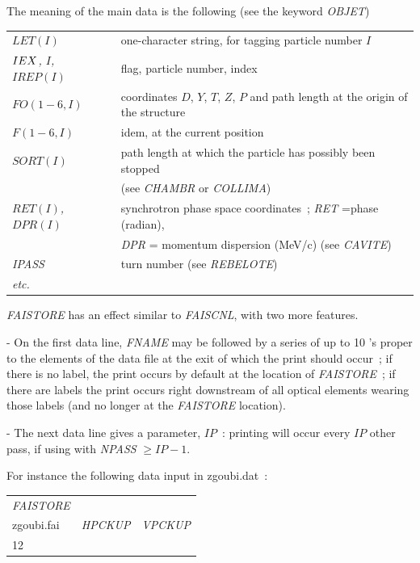 \noindent The meaning of the main data is the following (see the keyword \textsl{OBJET})
\bigskip

{\renewcommand{\arraystretch}{1}
 \begin{tabular}{>{\sl}l!{~:}l}
	$LET(I) $  & one-character string, for tagging particle number $I$  \\
	$IEX\index{IEX@{\IEX}}$, $I$, $IREP(I)$   &  flag, particle number, index  \\
	 $FO(1-6, I)$  &  coordinates $D$, $Y$, $T$, $Z$, $P$ and path
	                 length at the origin of the structure\\
	 $F(1-6, I)$  &  idem, at the current position\\
     $SORT(I)$ & path length at which the particle has possibly been stopped\\
             & (see \textsl{CHAMBR} or \textsl{COLLIMA})\\
     $RET(I)$, $DPR(I)$ & synchrotron phase space coordinates~; \textsl{RET} =phase (radian),\\
           &   \textsl{DPR} = momentum dispersion (MeV/c) (see \textsl{CAVITE}) \\
    \textsl{IPASS}  &  turn number (see \textsl{REBELOTE}) \\
 etc.
     \end{tabular}}
\bigskip

\noindent\textsl{FAISTORE} has an effect similar to \textsl{FAISCNL}, with two more features. 

- On the first data line, \textsl{FNAME} may be followed 
by a series of up to 10 \LABEL's proper to the elements of the data 
file at the exit of which the print should occur~; if there is no 
label, the print occurs by default at the location of \textsl{FAISTORE}~; if there are labels the 
print occurs right downstream of all optical elements wearing those labels
 (and no longer at the \textsl{FAISTORE} location). 

- The next data line 
gives a parameter, $IP$~: printing will occur every $IP$ other pass, if 
using \REBELOTE{} with \textsl{NPASS} $ \geq IP-1$. 

For instance the following data input in zgoubi.dat~: 

\medskip

{\renewcommand{\arraystretch}{1}
\begin{tabular}{lll}
	\textsl{FAISTORE} &  &   \\
	zgoubi.fai \index{zgoubi.fai} & \textsl{HPCKUP} & \textsl{VPCKUP}  \\
	12 &  & 
\end{tabular}}
\medskip

